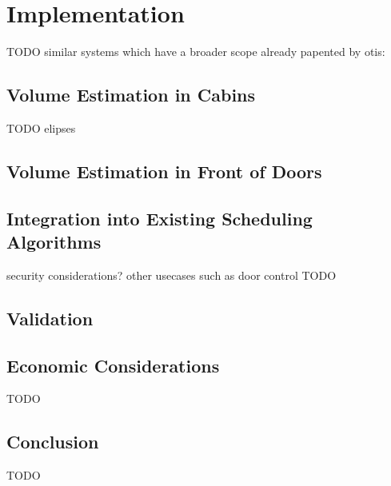\chapter{Implementation}
\label{chap:impl}

TODO
similar systems which have a broader scope already papented by otis:
\autocite{lin2011control}
\autocite{xang2016trafficlist}

\section{Volume Estimation in Cabins}

TODO elipses \autocite[][Chap.~2]{starkosch2010handbook}

\section{Volume Estimation in Front of Doors}

\section{Integration into Existing Scheduling Algorithms}

security considerations?
other usecases such as door control
TODO

\section{Validation}

\section{Economic Considerations}

TODO

\section{Conclusion}

TODO